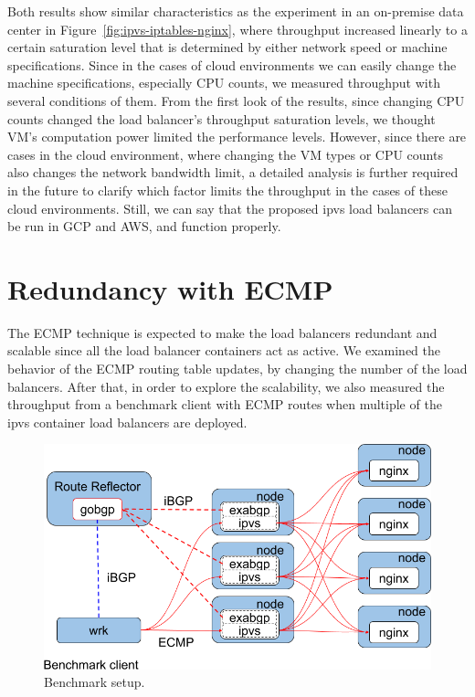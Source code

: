 Both results show similar characteristics as the experiment in an on-premise data center in Figure~\ref{fig:ipvs-iptables-nginx}, where throughput increased linearly to a certain saturation level that is determined by either network speed or machine specifications.
Since in the cases of cloud environments we can easily change the machine specifications, especially CPU counts, we measured throughput with several conditions of them.
From the first look of the results, since changing CPU counts changed the load balancer's throughput saturation levels, we thought VM's computation power limited the performance levels.
However, since there are cases in the cloud environment, where changing the VM types or CPU counts also changes the network bandwidth limit, a detailed analysis is further required in the future to clarify which factor limits the throughput in the cases of these cloud environments.
Still, we can say that the proposed ipvs load balancers can be run in GCP and AWS, and function properly.

\FloatBarrier

\section{Redundancy with ECMP}

The ECMP technique is expected to make the load balancers redundant and scalable since all the load balancer containers act as active.
We examined the behavior of the ECMP routing table updates, by changing the number of the load balancers.
After that, in order to explore the scalability, we also measured the throughput from a benchmark client with ECMP routes when multiple of the ipvs container load balancers are deployed.

\begin{figure}[h]
  \centering
  \includegraphics[width=0.9\columnwidth]{Figs/lb_ecmp_schem}

  \centering
  \begin{minipage}{0.9\columnwidth}
    \caption[Benchmark setup]{Benchmark setup.}
    \label{fig:ecmp-benchmark-schem}
  \end{minipage}
\end{figure}

